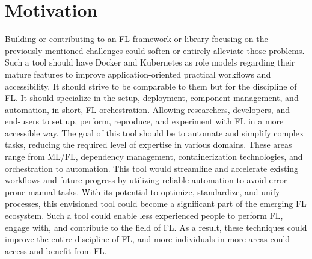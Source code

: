 \section{Motivation}

Building or contributing to an FL framework or library focusing on the previously mentioned challenges could soften or entirely alleviate those problems. 
Such a tool should have Docker and Kubernetes as role models regarding their mature features to improve application-oriented practical workflows and accessibility.
It should strive to be comparable to them but for the discipline of FL.
It should specialize in the setup, deployment, component management, and automation, in short, FL orchestration.
Allowing researchers, developers, and end-users to set up, perform, reproduce, and experiment with FL in a more accessible way.
The goal of this tool should be to automate and simplify complex tasks, reducing the required level of expertise in various domains.
These areas range from ML/FL, dependency management, containerization technologies, and orchestration to automation.
This tool would streamline and accelerate existing workflows and future progress by utilizing reliable automation to avoid error-prone manual tasks.
With its potential to optimize, standardize, and unify processes, this envisioned tool could become a significant part of the emerging FL ecosystem.
Such a tool could enable less experienced people to perform FL, engage with, and contribute to the field of FL.
As a result, these techniques could improve the entire discipline of FL, and more individuals in more areas could access and benefit from FL.